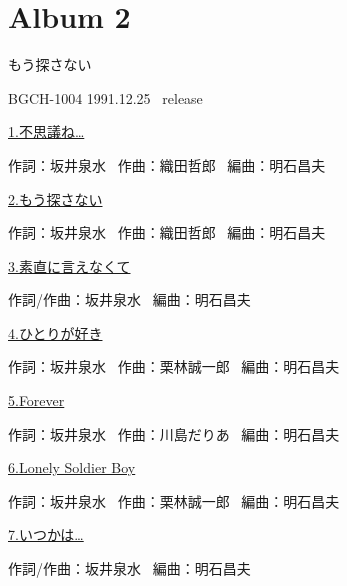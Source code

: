 
\chapter{Album 2}
\thispagestyle{empty} %
\vspace{-16mm}
\LARGE {もう探さない}

\normalsize{BGCH-1004 1991.12.25 \ release}
\\

\vspace{-5mm}


\small{\hyperlink{2_0}{1.不思議ね…}}

\tiny{作詞：坂井泉水 \ 作曲：織田哲郎 \ 編曲：明石昌夫}

\small{\hyperlink{2_1}{2.もう探さない}}

\tiny{作詞：坂井泉水 \ 作曲：織田哲郎 \ 編曲：明石昌夫}

\small{\hyperlink{2_2}{3.素直に言えなくて}}

\tiny{作詞/作曲：坂井泉水 \ 編曲：明石昌夫}

\small{\hyperlink{2_3}{4.ひとりが好き}}

\tiny{作詞：坂井泉水 \ 作曲：栗林誠一郎 \ 編曲：明石昌夫}

\small{\hyperlink{2_4}{5.Forever}}

\tiny{作詞：坂井泉水 \ 作曲：川島だりあ \ 編曲：明石昌夫}

\small{\hyperlink{2_5}{6.Lonely Soldier Boy}}

\tiny{作詞：坂井泉水 \ 作曲：栗林誠一郎 \ 編曲：明石昌夫}

\small{\hyperlink{2_6}{7.いつかは…}}

\tiny{作詞/作曲：坂井泉水 \ 編曲：明石昌夫}

\small{ \ }

\tiny{ \ }

\small{ \ }

\tiny{ \ }

\small{ \ }

\tiny{ \ }

\small{ \ }

\tiny{ \ }

\small{ \ }

\tiny{ \ }

\clearpage
